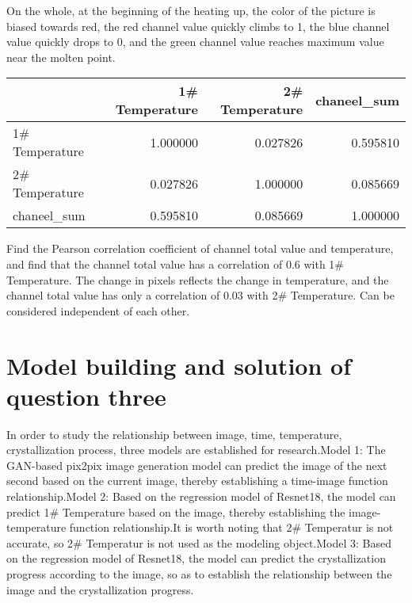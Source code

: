 \documentclass[12pt]{apmcmthesis}
\begin{document}
On the whole, at the beginning of the heating up, the color of the picture is biased towards red, the red channel value quickly climbs to 1, the blue channel value quickly drops to 0, and the green channel value reaches maximum value near the molten point.


\begin{center}
\begin{tabular}{lrrr}
	\toprule
	{} &  1\# Temperature &  2\# Temperature &       chaneel\_sum \\
	\midrule
	1\# Temperature &        1.000000 &        0.027826 &  0.595810 \\
	2\# Temperature &        0.027826 &        1.000000 &  0.085669 \\
	chaneel\_sum            &        0.595810 &        0.085669 &  1.000000 \\
	\bottomrule
\end{tabular}
\end{center}

Find the Pearson correlation coefficient of channel total value and temperature, and find that the channel total value has a correlation of 0.6 with 1\# Temperature. The change in pixels reflects the change in temperature, and the channel total value has only a correlation of 0.03 with 2\# Temperature. Can be considered independent of each other.


\section{Model building and solution of question three}
In order to study the relationship between image, time, temperature, crystallization process, three models are established for research.Model 1: The GAN-based pix2pix image generation model can predict the image of the next second based on the current image, thereby establishing a time-image function relationship.Model 2: Based on the regression model of Resnet18, the model can predict 1\# Temperature based on the image, thereby establishing the image-temperature function relationship.It is worth noting that 2\# Temperatur is not accurate, so 2\# Temperatur is not used as the modeling object.Model 3: Based on the regression model of Resnet18, the model can predict the crystallization progress according to the image, so as to establish the relationship between the image and the crystallization progress.
\end{document}
